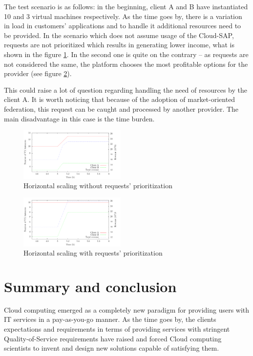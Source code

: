 \documentclass[twocolumn]{svjour3}          %
\begin{document}
The test scenario is as follows: in the beginning, client A and B have instantiated 10 and 3 virtual machines respectively. As the time goes by, there is a variation in load in customers' applications and to handle it additional resources need to be provided. In the scenario which does not assume usage of the Cloud-SAP, requests are not prioritized which results in generating lower income, what is shown in the figure \ref{fig:hor-scaling-no-prioritization}. In the second one is quite on the contrary -- as requests are not considered the same, the platform chooses the most profitable options for the provider (see figure \ref{fig:hor-scaling-with-prioritization}).

This could raise a lot of question regarding handling the need of resources by the client A. It is worth noticing that because of the adoption of market-oriented federation, this request can be caught and processed by another provider. The main disadvantage in this case is the time burden.

\begin{figure}
  \includegraphics[width=0.47\textwidth]{figures/request-priority-revenue-1}
\caption{Horizontal scaling without  requests' prioritization}
\label{fig:hor-scaling-no-prioritization}       %
\end{figure}

\begin{figure}
  \includegraphics[width=0.47\textwidth]{figures/request-priority-revenue-2}
\caption{Horizontal scaling with requests' prioritization}
\label{fig:hor-scaling-with-prioritization}       %
\end{figure}


\section{Summary and conclusion}
Cloud computing emerged as a completely new paradigm for providing users with IT services in a pay-as-you-go manner. As the time goes by, the clients expectations and requirements in terms of providing services with stringent Quality-of-Service requirements have raised and forced Cloud computing scientists to invent and design new solutions capable of satisfying them.
\end{document}

